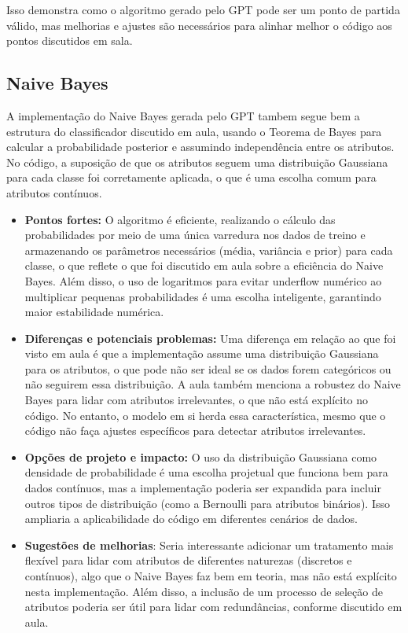 \documentclass[12pt]{article}
\begin{document}
Isso demonstra como o algoritmo gerado pelo GPT pode ser um ponto de partida válido, mas melhorias e ajustes são necessários para alinhar melhor o código aos pontos discutidos em sala.

\subsection{Naive Bayes}

A implementação do Naive Bayes gerada pelo GPT tambem segue bem a estrutura do classificador discutido em aula, usando o Teorema de Bayes para calcular a probabilidade posterior e assumindo independência entre os atributos. No código, a suposição de que os atributos seguem uma distribuição Gaussiana para cada classe foi corretamente aplicada, o que é uma escolha comum para atributos contínuos.

\begin{itemize}
    \item \textbf{Pontos fortes:} O algoritmo é eficiente, realizando o cálculo das probabilidades por meio de uma única varredura nos dados de treino e armazenando os parâmetros necessários (média, variância e prior) para cada classe, o que reflete o que foi discutido em aula sobre a eficiência do Naive Bayes. Além disso, o uso de logaritmos para evitar underflow numérico ao multiplicar pequenas probabilidades é uma escolha inteligente, garantindo maior estabilidade numérica.
    
    \item \textbf{Diferenças e potenciais problemas:} Uma diferença em relação ao que foi visto em aula é que a implementação assume uma distribuição Gaussiana para os atributos, o que pode não ser ideal se os dados forem categóricos ou não seguirem essa distribuição. A aula também menciona a robustez do Naive Bayes para lidar com atributos irrelevantes, o que não está explícito no código. No entanto, o modelo em si herda essa característica, mesmo que o código não faça ajustes específicos para detectar atributos irrelevantes.
    
    \item \textbf{Opções de projeto e impacto:} O uso da distribuição Gaussiana como densidade de probabilidade é uma escolha projetual que funciona bem para dados contínuos, mas a implementação poderia ser expandida para incluir outros tipos de distribuição (como a Bernoulli para atributos binários). Isso ampliaria a aplicabilidade do código em diferentes cenários de dados.
    
    \item \textbf{Sugestões de melhorias}: Seria interessante adicionar um tratamento mais flexível para lidar com atributos de diferentes naturezas (discretos e contínuos), algo que o Naive Bayes faz bem em teoria, mas não está explícito nesta implementação. Além disso, a inclusão de um processo de seleção de atributos poderia ser útil para lidar com redundâncias, conforme discutido em aula.
\end{itemize}
\end{document}

